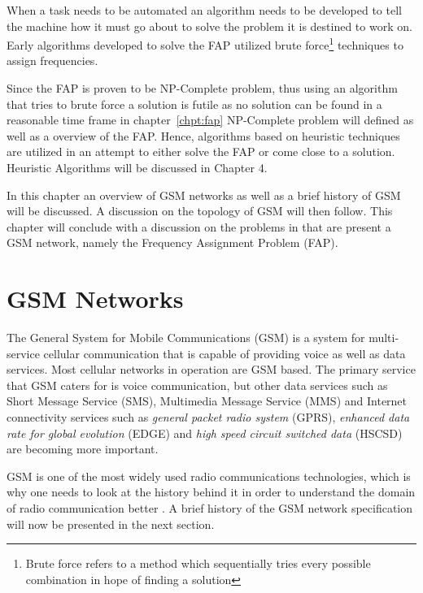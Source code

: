 When a task needs to be automated an algorithm needs to be developed to tell the machine how it must go about to solve the problem it is destined to work on\cite{Karen2004,Eisenblatter,GSMArchitectureProtocolsServices,GSM92,wirelesstelcoMullet}. Early algorithms developed to solve the FAP utilized brute force\footnote{Brute force refers to a method which sequentially tries every possible combination in hope of finding a solution} techniques to assign frequencies\cite{Karen2004,Eisenblatter,GSMArchitectureProtocolsServices,GSM92,wirelesstelcoMullet}.

Since the FAP is proven to be NP-Complete problem, thus using an algorithm that tries to brute force a solution is futile as no solution can be found in a reasonable time frame in chapter~\ref{chpt:fap} NP-Complete problem will defined as well as a overview of the FAP. Hence, algorithms based on heuristic techniques are utilized in an attempt to either solve the FAP or come close to a solution. Heuristic Algorithms will be discussed in Chapter 4.

In this chapter an overview of GSM networks as well as a brief history of GSM will be discussed. A discussion on the topology of GSM will then follow. This chapter will conclude with a discussion on the problems in that are present a GSM network, namely the Frequency Assignment Problem (FAP).

\section{GSM Networks}
The General System for Mobile Communications (GSM) is a system for multi-service cellular communication that is capable of providing voice as well as data services\cite{Karen2004,Eisenblatter,GSMArchitectureProtocolsServices,GSM92,wirelesstelcoMullet}. Most cellular networks in operation are GSM based\cite{Karen2004,Eisenblatter,GSMArchitectureProtocolsServices,GSM92,wirelesstelcoMullet}. The primary service that GSM caters for is voice communication, but other data services such as Short Message Service (SMS), Multimedia Message Service (MMS) and Internet connectivity services such as \emph{general packet radio system} (GPRS), \emph{enhanced data rate for global evolution} (EDGE) and \emph{high speed circuit switched data} (HSCSD) are becoming more important\cite{GSMArchitectureProtocolsServices,Eisenblatter}.

GSM is one of the most widely used radio communications technologies, which is why one needs to look at the history behind it in order to understand the domain of radio communication better \cite{GSMArchitectureProtocolsServices}. A brief history of the GSM network specification will now be presented in the next section.

